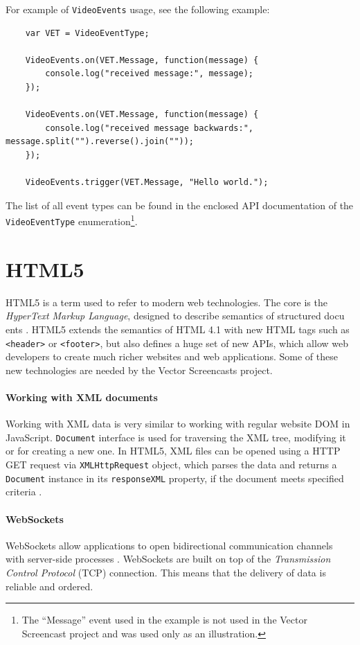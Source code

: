For example of \verb|VideoEvents| usage, see the following example:

\begin{lstlisting}
	var VET = VideoEventType;

	VideoEvents.on(VET.Message, function(message) {
		console.log("received message:", message);
	});

	VideoEvents.on(VET.Message, function(message) {
		console.log("received message backwards:", message.split("").reverse().join(""));
	});

	VideoEvents.trigger(VET.Message, "Hello world.");
\end{lstlisting}


The list of all event types can be found in the enclosed API documentation of the \verb|VideoEventType| enumeration\footnote{The ``Message'' event used in the example is not used in the Vector Screencast project and was used only as an illustration.}.


\section{HTML5}

HTML5 is a term used to refer to modern web technologies. The core is the \textit{HyperText Markup Language}, designed to describe semantics of structured docu ents \cite{html5}. HTML5 extends the semantics of HTML 4.1 with new HTML tags such as \verb|<header>| or \verb|<footer>|, but also defines a huge set of new APIs, which allow web developers to create much richer websites and web applications. Some of these new technologies are needed by the Vector Screencasts project.

\paragraph{Working with XML documents}
Working with XML data is very similar to working with regular website DOM in JavaScript. \verb|Document| interface is used for traversing the XML tree, modifying it or for creating a new one. In HTML5, XML files can be opened using a HTTP GET request via \verb|XMLHttpRequest| object, which parses the data and returns a \verb|Document| instance in its \verb|responseXML| property, if the document meets specified criteria \cite{xhr}.

\paragraph{WebSockets}
WebSockets allow applications to open bidirectional communication channels with server-side processes \cite{websocket}. WebSockets are built on top of the \textit{Transmission Control Protocol} (TCP) connection. This means that the delivery of data is reliable and ordered.

